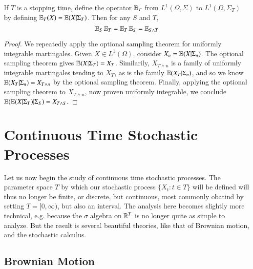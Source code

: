 \begin{theorem}
    If $T$ is a stopping time, define the operator $\operatorname{\mathbb{E}}_T$ from $L^1(\Omega, \Sigma)$ to $L^1(\Omega, \Sigma_T)$ by defining $\operatorname{\mathbb{E}}_T(X) = \operatorname{\mathbb{E}}(X|\Sigma_T)$. Then for any $S$ and $T$,
    \[ \operatorname{\mathbb{E}}_S \operatorname{\mathbb{E}}_T = \operatorname{\mathbb{E}}_T \operatorname{\mathbb{E}}_S = \operatorname{\mathbb{E}}_{S \wedge T} \]
\end{theorem}
\begin{proof}
    We repeatedly apply the optional sampling theorem for uniformly integrable martingales. Given $X \in L^1(\Omega)$, consider $X_n = \operatorname{\mathbb{E}}(X|\Sigma_n)$. The optional sampling theorem gives $\operatorname{\mathbb{E}}(X|\Sigma_T) = X_T$. Similarily, $X_{T \wedge n}$ is a family of uniformly integrable martingales tending to $X_T$, as is the family $\operatorname{\mathbb{E}}(X_T|\Sigma_n)$, and so we know $\operatorname{\mathbb{E}}(X_T|\Sigma_n) = X_{T \wedge n}$ by the optional sampling theorem. Finally, applying the optional sampling theorem to $X_{T \wedge n}$, now proven uniformly integrable, we conclude $\operatorname{\mathbb{E}}(\operatorname{\mathbb{E}}(X|\Sigma_T)|\Sigma_S) = X_{T \wedge S}$.
\end{proof}

\part{Continuous Time Stochastic Processes}




Let us now begin the study of continuous time stochastic processes. The parameter space $T$ by which our stochastic process $\{ X_t: t \in T \}$ will be defined will thus no longer be finite, or discrete, but continuous, most commonly obatind by setting $T = [0,\infty)$, but also an interval. The analysis here becomes slightly more technical, e.g. because the $\sigma$ algebra on $\operatorname{\mathbb{R}}^T$ is no longer quite as simple to analyze. But the result is several beautiful theories, like that of Brownian motion, and the stochastic calculus.










\chapter{Brownian Motion}

